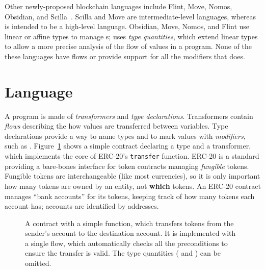 \documentclass[dvipsnames,runningheads]{llncs}
\begin{document}
Other newly-proposed blockchain languages include Flint, Move, Nomos, Obsidian, and Scilla~\cite{schrans2018flint,blackshear2019move,das2019nomos,coblenz2019obsidian,sergey2019scilla}.
Scilla and Move are intermediate-level languages, whereas \langName is intended to be a high-level language.
Obsidian, Move, Nomos, and Flint use linear or affine types to manage \assetTxt{}s; \langName uses \emph{type quantities}, which extend linear types to allow a more precise analysis of the flow of values in a program.
None of the these languages have flows or provide support for all the modifiers that \langName does.

\section{Language}\label{sec:lang}
A \langName program is made of \emph{transformers} and \emph{type declarations}.
Transformers contain \emph{flows} describing the how values are transferred between variables.
Type declarations provide a way to name types and to mark values with \emph{modifiers}, such as .
Figure~\ref{fig:erc20-transfer-flow} shows a simple contract declaring a type and a transformer, which implements the core of ERC-20's \lstinline{transfer} function.
ERC-20 is a standard providing a bare-bones interface for token contracts managing \emph{fungible} tokens.
Fungible tokens are interchangeable (like most currencies), so it is only important how many tokens are owned by an entity, not \textbf{which} tokens.
An ERC-20 contract manages ``bank accounts'' for its tokens, keeping track of how many tokens each account has; accounts are identified by addresses.

\begin{figure}
    \vspace{-2em}
    \centering
    
    \vspace{-1em}
    \caption{A \langName contract with a simple  function, which transfers  tokens from the sender's account to the destination account.
It is implemented with a single flow, which automatically checks all the preconditions to ensure the transfer is valid.
The type quantities ( and ) can be omitted.}
    \label{fig:erc20-transfer-flow}
    \vspace{-2em}
\end{figure}
\end{document}
